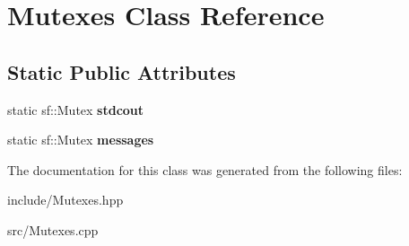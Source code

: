 \hypertarget{class_mutexes}{\section{Mutexes Class Reference}
\label{class_mutexes}
}
\subsection*{Static Public Attributes}
\begin{DoxyCompactItemize}
\item 
\hypertarget{class_mutexes_a4ecb3dbaf0f590b2d8ba42cec64fdd93}{static sf\-::\-Mutex {\bfseries stdcout}}\label{class_mutexes_a4ecb3dbaf0f590b2d8ba42cec64fdd93}

\item 
\hypertarget{class_mutexes_ad263e2d0b12f337beacbc53ffd69905b}{static sf\-::\-Mutex {\bfseries messages}}\label{class_mutexes_ad263e2d0b12f337beacbc53ffd69905b}

\end{DoxyCompactItemize}


The documentation for this class was generated from the following files\-:\begin{DoxyCompactItemize}
\item 
include/Mutexes.\-hpp\item 
src/Mutexes.\-cpp\end{DoxyCompactItemize}
